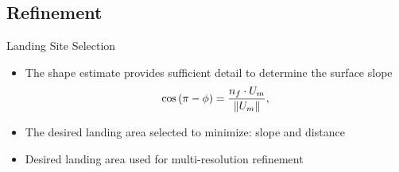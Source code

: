 \subsection{Refinement}
\begin{frame}{Landing Site Selection}
    \begin{itemize}
        \item The shape estimate provides sufficient detail to determine the surface slope
            \begin{align*}
                \cos \left(  \pi - \phi  \right) = \frac{n_f \cdot U_m}{\left\| U_m \right\|},
            \end{align*}
        \item The desired landing area selected to minimize: slope and distance
        \item Desired landing area used for multi-resolution refinement
    \end{itemize}
    \pause
    \begin{center}
\end{center}
\end{frame}

